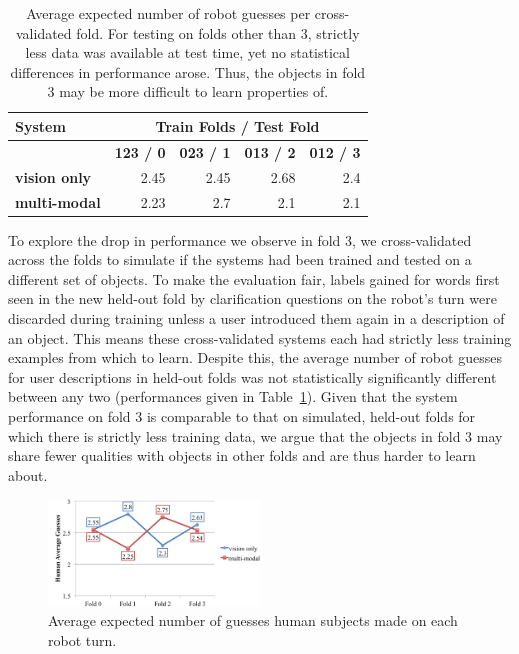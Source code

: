 \begin{table}
\centering
\begin{tabular}{|l|r|r|r|r|}
	\hline
	\bf System & \multicolumn{4}{c|}{\bf Train Folds / Test Fold} \\ \hline \hline
	& \bf 123 / 0 & \bf 023 / 1 & \bf 013 / 2 & \bf 012 / 3 \\ \hline
	\bf vision only & 2.45 & 2.45 & 2.68 & 2.4 \\ \hline
	\bf multi-modal & 2.23 & 2.7 & 2.1 & 2.1 \\ \hline
\end{tabular}
\caption{Average expected number of robot guesses per cross-validated fold. For testing on folds other than 3, strictly less data was available at test time, yet no statistical differences in performance arose. Thus, the objects in fold 3 may be more difficult to learn properties of.}
\label{tab:crossval}
\end{table}

To explore the drop in performance we observe in fold 3, we cross-validated across the folds to simulate if the systems had been trained and tested on a different set of objects.
To make the evaluation fair, labels gained for words first seen in the new held-out fold by clarification questions on the robot's turn were discarded during training unless a user introduced them again in a description of an object.
This means these cross-validated systems each had strictly less training examples from which to learn.
Despite this, the average number of robot guesses for user descriptions in held-out folds was not statistically significantly different between any two (performances given in Table~\ref{tab:crossval}).
Given that the system performance on fold 3 is comparable to that on simulated, held-out folds for which there is strictly less training data, we argue that the objects in fold 3 may share fewer qualities with objects in other folds and are thus harder to learn about.

\begin{figure}
\centering
\includegraphics[width=0.5\textwidth]{figures/human_guesses.png}
\caption{Average expected number of guesses human subjects made on each robot turn.}
\label{fig:human_guesses}
\end{figure}

